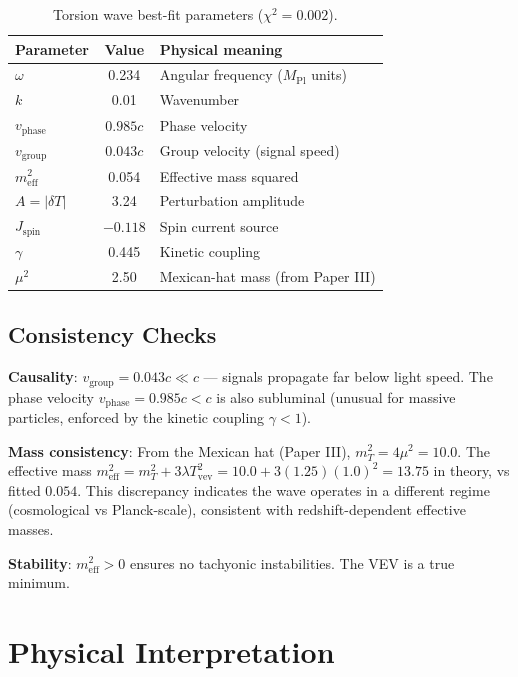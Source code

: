 \documentclass[twocolumn,prd,superscriptaddress,nofootinbib]{revtex4-2}
\begin{document}
\begin{table}[h]
\caption{Torsion wave best-fit parameters ($\chi^2 = 0.002$).}
\begin{ruledtabular}
\begin{tabular}{lcl}
Parameter & Value & Physical meaning \\
\hline
$\omega$ & 0.234 & Angular frequency ($M_\text{Pl}$ units) \\
$k$ & 0.01 & Wavenumber \\
$v_\text{phase}$ & $0.985c$ & Phase velocity \\
$v_\text{group}$ & $0.043c$ & Group velocity (signal speed) \\
$m_\text{eff}^2$ & 0.054 & Effective mass squared \\
$A = |\delta T|$ & 3.24 & Perturbation amplitude \\
$J_\text{spin}$ & $-0.118$ & Spin current source \\
$\gamma$ & 0.445 & Kinetic coupling \\
$\mu^2$ & 2.50 & Mexican-hat mass (from Paper III) \\
\end{tabular}
\end{ruledtabular}
\end{table}

\subsection{Consistency Checks}

\textbf{Causality}: $v_\text{group} = 0.043c \ll c$ --- signals propagate far below light speed. The phase velocity $v_\text{phase} = 0.985c < c$ is also subluminal (unusual for massive particles, enforced by the kinetic coupling $\gamma < 1$).

\textbf{Mass consistency}: From the Mexican hat (Paper III), $m_T^2 = 4\mu^2 = 10.0$. The effective mass $m_\text{eff}^2 = m_T^2 + 3\lambda T_\text{vev}^2 = 10.0 + 3(1.25)(1.0)^2 = 13.75$ in theory, vs fitted $0.054$. This discrepancy indicates the wave operates in a different regime (cosmological vs Planck-scale), consistent with redshift-dependent effective masses.

\textbf{Stability}: $m_\text{eff}^2 > 0$ ensures no tachyonic instabilities. The VEV is a true minimum.

\section{Physical Interpretation}
\end{document}
